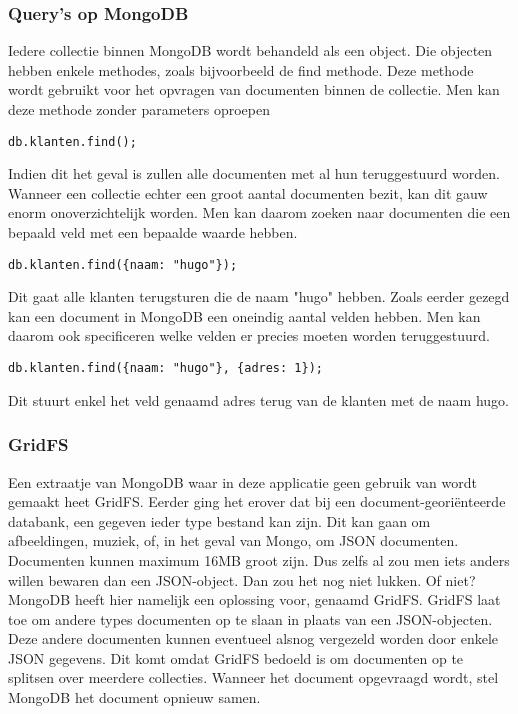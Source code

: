 \documentclass[a4paper,11pt]{article}
\begin{document}
\subsubsection{Query's op MongoDB}
Iedere collectie binnen MongoDB wordt behandeld als een object. Die objecten hebben enkele methodes, zoals bijvoorbeeld de find methode. Deze methode wordt gebruikt voor het opvragen van documenten binnen de collectie. Men kan deze methode zonder parameters oproepen
\begin{lstlisting}
db.klanten.find();
\end{lstlisting}
Indien dit het geval is zullen alle documenten met al hun teruggestuurd worden. Wanneer een collectie echter een groot aantal documenten bezit, kan dit gauw enorm onoverzichtelijk worden. Men kan daarom zoeken naar documenten die een bepaald veld met een bepaalde waarde hebben.
\begin{lstlisting}
db.klanten.find({naam: "hugo"});
\end{lstlisting}
Dit gaat alle klanten terugsturen die de naam "hugo" hebben. Zoals eerder gezegd kan een document in MongoDB een oneindig aantal velden hebben. Men kan daarom ook specificeren welke velden er precies moeten worden teruggestuurd.
\begin{lstlisting}
db.klanten.find({naam: "hugo"}, {adres: 1});
\end{lstlisting}
Dit stuurt enkel het veld genaamd adres terug van de klanten met de naam hugo.

\subsubsection{GridFS}
Een extraatje van MongoDB waar in deze applicatie geen gebruik van wordt gemaakt heet GridFS. Eerder ging het erover dat bij een document-georiënteerde databank, een gegeven ieder type bestand kan zijn. Dit kan gaan om afbeeldingen, muziek, of, in het geval van Mongo, om JSON documenten. Documenten kunnen maximum 16MB groot zijn. Dus zelfs al zou men iets anders willen bewaren dan een JSON-object. Dan zou het nog niet lukken. Of niet? MongoDB heeft hier namelijk een oplossing voor, genaamd GridFS. GridFS laat toe om andere types documenten op te slaan in plaats van een JSON-objecten. Deze andere documenten kunnen eventueel alsnog vergezeld worden door enkele JSON gegevens. Dit komt omdat GridFS bedoeld is om documenten op te splitsen over meerdere collecties. Wanneer het document opgevraagd wordt, stel MongoDB het document opnieuw samen.
\end{document}
